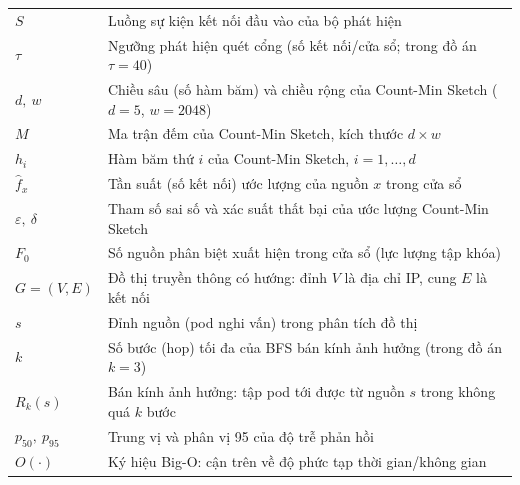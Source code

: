 \begin{longtable}{@{}p{3.5cm} p{10.5cm}@{}}

$S$                    & Luồng sự kiện kết nối đầu vào của bộ phát hiện \\
$\tau$                 & Ngưỡng phát hiện quét cổng (số kết nối/cửa sổ; trong đồ án $\tau = 40$) \\
$d,\ w$                & Chiều sâu (số hàm băm) và chiều rộng của Count-Min Sketch ($d=5$, $w=2048$) \\
$M$                    & Ma trận đếm của Count-Min Sketch, kích thước $d \times w$ \\
$h_i$                  & Hàm băm thứ $i$ của Count-Min Sketch, $i = 1, \ldots, d$ \\
$\hat{f}_x$            & Tần suất (số kết nối) ước lượng của nguồn $x$ trong cửa sổ \\
$\varepsilon,\ \delta$ & Tham số sai số và xác suất thất bại của ước lượng Count-Min Sketch \\
$F_0$                  & Số nguồn phân biệt xuất hiện trong cửa sổ (lực lượng tập khóa) \\
$G = (V, E)$           & Đồ thị truyền thông có hướng: đỉnh $V$ là địa chỉ IP, cung $E$ là kết nối \\
$s$                    & Đỉnh nguồn (pod nghi vấn) trong phân tích đồ thị \\
$k$                    & Số bước (hop) tối đa của BFS bán kính ảnh hưởng (trong đồ án $k = 3$) \\
$R_k(s)$               & Bán kính ảnh hưởng: tập pod tới được từ nguồn $s$ trong không quá $k$ bước \\
$p_{50},\ p_{95}$      & Trung vị và phân vị 95 của độ trễ phản hồi \\
$O(\cdot)$             & Ký hiệu Big-O: cận trên về độ phức tạp thời gian/không gian \\

\end{longtable}
